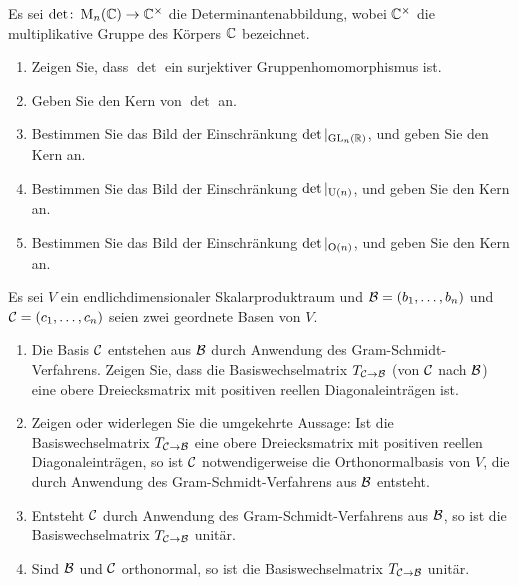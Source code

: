 \begin{question}[subtitle = Die Determinanten einiger Matrixgruppen]{3}
  Es sei $\det \colon \operatorname{M}_n(\mathbb{C}) \to \mathbb{C}^\times$ die Determinantenabbildung, wobei $\mathbb{C}^\times$ die multiplikative Gruppe des Körpers $\mathbb{C}$ bezeichnet.
  \begin{enumerate}[leftmargin=*]
    \item
      Zeigen Sie, dass $\det$ ein surjektiver Gruppenhomomorphismus ist.
    \item
     Geben Sie den Kern von $\det$ an.
    \item
      Bestimmen Sie das Bild der Einschränkung $\det|_{\operatorname{GL}_n(\mathbb{R})}$, und geben Sie den Kern an.
    \item
      Bestimmen Sie das Bild der Einschränkung $\det|_{\operatorname{U}(n)}$, und geben Sie den Kern an.
    \item
      Bestimmen Sie das Bild der Einschränkung $\det|_{\operatorname{O}(n)}$, und geben Sie den Kern an.
  \end{enumerate}
\end{question}


\begin{question}[subtitle = Darstellende Matrizen von Gram-Schmidt]{3}
  Es sei $V$ ein endlichdimensionaler Skalarproduktraum und $\mathcal{B} = (b_1, \dotsc, b_n)$ und $\mathcal{C} = (c_1, \dotsc, c_n)$ seien zwei geordnete Basen von $V$.
  \begin{enumerate}[leftmargin=*]
    \item
      Die Basis $\mathcal{C}$ entstehen aus $\mathcal{B}$ durch Anwendung des Gram-Schmidt-Verfahrens.
      Zeigen Sie, dass die Basiswechselmatrix $T_{\mathcal{C} \to \mathcal{B}}$ (von $\mathcal{C}$ nach $\mathcal{B}$) eine obere Dreiecksmatrix mit positiven reellen Diagonaleinträgen ist.
    \item
      Zeigen oder widerlegen Sie die umgekehrte Aussage:
      Ist die Basiswechselmatrix $T_{\mathcal{C} \to \mathcal{B}}$ eine obere Dreiecksmatrix mit positiven reellen Diagonaleinträgen, so ist $\mathcal{C}$ notwendigerweise die Orthonormalbasis von $V$, die durch Anwendung des Gram-Schmidt-Verfahrens aus $\mathcal{B}$ entsteht.
    \item
      Entsteht $\mathcal{C}$ durch Anwendung des Gram-Schmidt-Verfahrens aus $\mathcal{B}$, so ist die Basiswechselmatrix $T_{\mathcal{C} \to \mathcal{B}}$ unitär.
    \item
      Sind $\mathcal{B}$ und $\mathcal{C}$ orthonormal, so ist die Basiswechselmatrix $T_{\mathcal{C} \to \mathcal{B}}$ unitär.
  \end{enumerate}
\end{question}


